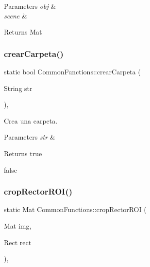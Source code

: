 \begin{DoxyParams}{Parameters}
{\em obj} & \\
\hline
{\em scene} & \\
\hline
\end{DoxyParams}
\begin{DoxyReturn}{Returns}
Mat 
\end{DoxyReturn}
\mbox{\label{classCommonFunctions_acb8852ee747cb715a16e6dd9126d560d}} 
\subsubsection{\texorpdfstring{crear\+Carpeta()}{crearCarpeta()}}
{\footnotesize\ttfamily static bool Common\+Functions\+::crear\+Carpeta (\begin{DoxyParamCaption}\item[{String}]{str }\end{DoxyParamCaption})\hspace{0.3cm}{\ttfamily [inline]}, {\ttfamily [static]}}



Crea una carpeta. 


\begin{DoxyParams}{Parameters}
{\em str} & \\
\hline
\end{DoxyParams}
\begin{DoxyReturn}{Returns}
true 

false 
\end{DoxyReturn}
\mbox{\label{classCommonFunctions_a59211fa9ca611fd09496f4e376649ab2}} 
\subsubsection{\texorpdfstring{crop\+Rector\+R\+O\+I()}{cropRectorROI()}}
{\footnotesize\ttfamily static Mat Common\+Functions\+::crop\+Rector\+R\+OI (\begin{DoxyParamCaption}\item[{Mat}]{img,  }\item[{Rect}]{rect }\end{DoxyParamCaption})\hspace{0.3cm}{\ttfamily [inline]}, {\ttfamily [static]}}



